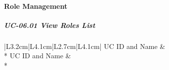 \paragraph{Role Management}

\subparagraph{UC-06.01 View Roles List}

{\singlespacing
\setlength{\extrarowheight}{4pt}
\begin{longtable}{|L{3.2cm}|L{4.1cm}|L{2.7cm}|L{4.1cm}|}
\hline
{}UC ID and Name &  \\* \hline
\endfirsthead
\hline
{}UC ID and Name &  \\* \hline
\endhead
\hline\endfoot
\endlastfoot


\end{longtable}}
